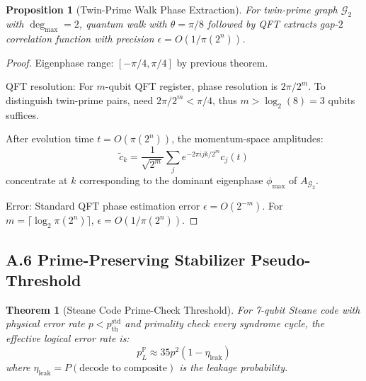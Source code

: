 \documentclass[11pt,letterpaper]{article}
\newtheorem{theorem}{Theorem}
\newtheorem{proposition}{Proposition}
\begin{document}
\begin{proposition}[Twin-Prime Walk Phase Extraction]
For twin-prime graph $\mathcal{G}_2$ with $\deg_{\max} = 2$, quantum walk with $\theta = \pi/8$ followed by QFT extracts gap-$2$ correlation function with precision $\epsilon = O(1/\pi(2^n))$.
\end{proposition}

\begin{proof}
Eigenphase range: $[-\pi/4, \pi/4]$ by previous theorem.

QFT resolution: For $m$-qubit QFT register, phase resolution is $2\pi/2^m$. To distinguish twin-prime pairs, need $2\pi/2^m < \pi/4$, thus $m > \log_2(8) = 3$ qubits suffices.

After evolution time $t = O(\pi(2^n))$, the momentum-space amplitudes:
\[
\tilde{c}_k = \frac{1}{\sqrt{2^m}}\sum_j e^{-2\pi i jk/2^m} c_j(t)
\]
concentrate at $k$ corresponding to the dominant eigenphase $\phi_{\max}$ of $A_{\mathcal{G}_2}$.

Error: Standard QFT phase estimation error $\epsilon = O(2^{-m})$. For $m = \lceil \log_2 \pi(2^n) \rceil$, $\epsilon = O(1/\pi(2^n))$.
\end{proof}

\subsection{A.6 Prime-Preserving Stabilizer Pseudo-Threshold}

\begin{theorem}[Steane Code Prime-Check Threshold]
For 7-qubit Steane code with physical error rate $p < p_{\text{th}}^{\text{std}}$ and primality check every syndrome cycle, the effective logical error rate is:
\[
p_L^{\mathbb{P}} \approx 35p^2(1 - \eta_{\text{leak}})
\]
where $\eta_{\text{leak}} = P(\text{decode to composite})$ is the leakage probability.
\end{theorem}
\end{document}
